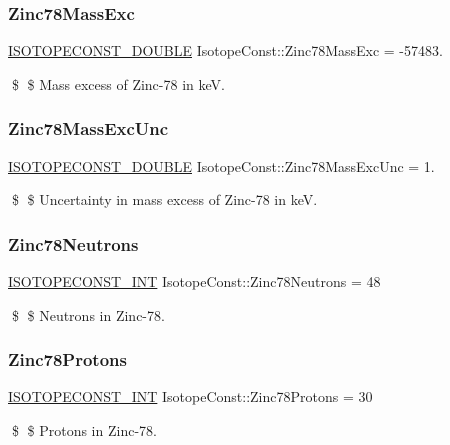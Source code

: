 \subsubsection{\texorpdfstring{Zinc78\+Mass\+Exc}{Zinc78MassExc}}
{\footnotesize\ttfamily \mbox{\hyperlink{group___isotope_const-_macros_ga8f45a7272ce02c0b4c65c44636ed719a}{I\+S\+O\+T\+O\+P\+E\+C\+O\+N\+S\+T\+\_\+\+D\+O\+U\+B\+LE}} Isotope\+Const\+::\+Zinc78\+Mass\+Exc = -\/57483.}

\$ \$ Mass excess of Zinc-\/78 in keV. \mbox{\label{group___isotope_const-_zinc-_zn78_ga65ea92df65d178bb3e7e65a247487443}} 
\subsubsection{\texorpdfstring{Zinc78\+Mass\+Exc\+Unc}{Zinc78MassExcUnc}}
{\footnotesize\ttfamily \mbox{\hyperlink{group___isotope_const-_macros_ga8f45a7272ce02c0b4c65c44636ed719a}{I\+S\+O\+T\+O\+P\+E\+C\+O\+N\+S\+T\+\_\+\+D\+O\+U\+B\+LE}} Isotope\+Const\+::\+Zinc78\+Mass\+Exc\+Unc = 1.}

\$ \$ Uncertainty in mass excess of Zinc-\/78 in keV. \mbox{\label{group___isotope_const-_zinc-_zn78_ga18bdd09a13d201356f2e234b10324876}} 
\subsubsection{\texorpdfstring{Zinc78\+Neutrons}{Zinc78Neutrons}}
{\footnotesize\ttfamily \mbox{\hyperlink{group___isotope_const-_macros_ga5f18360b3e99483a35c32d789e62621c}{I\+S\+O\+T\+O\+P\+E\+C\+O\+N\+S\+T\+\_\+\+I\+NT}} Isotope\+Const\+::\+Zinc78\+Neutrons = 48}

\$ \$ Neutrons in Zinc-\/78. \mbox{\label{group___isotope_const-_zinc-_zn78_gac7eeadc5f3c35cb2d267be5510017b19}} 
\subsubsection{\texorpdfstring{Zinc78\+Protons}{Zinc78Protons}}
{\footnotesize\ttfamily \mbox{\hyperlink{group___isotope_const-_macros_ga5f18360b3e99483a35c32d789e62621c}{I\+S\+O\+T\+O\+P\+E\+C\+O\+N\+S\+T\+\_\+\+I\+NT}} Isotope\+Const\+::\+Zinc78\+Protons = 30}

\$ \$ Protons in Zinc-\/78. 